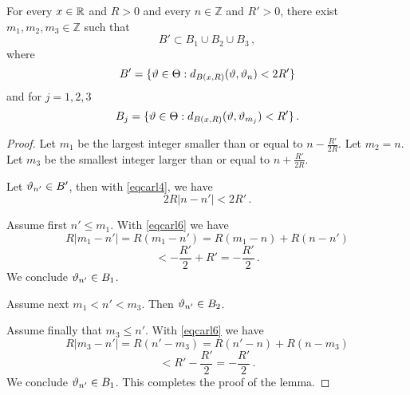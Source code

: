 \begin{lemma}
    \label{integer-ball-cover}
    \leanok
    For every $x\in {\mathbb{R}}$ and $R>0$ and every
    $n\in \mathbb{Z}$ and $R'>0$,
    there exist $m_1, m_2, m_3\in \mathbb{Z}$
    such that
    \begin{equation}\label{eqcarl5}
        B'\subset B_1\cup B_2\cup B_3\, ,
    \end{equation}
where
\begin{equation}
B'= \{ {\vartheta} \in {\Theta}: d_{B(x,R)}({\vartheta}, {\vartheta}_n)<2R'\}
\end{equation}
and for $j=1,2,3$
\begin{equation}
  B_j=
     \{ {\vartheta} \in {\Theta}: d_{B(x,R)}({\vartheta}, {\vartheta}_{m_j})<R'\}
     \, .
\end{equation}
\end{lemma}

\begin{proof}
\leanok
Let $m_1$ be the largest integer smaller than
or equal to
$n- \frac {R'} {2R}$.
Let $m_2=n$.
Let $m_3$ be the smallest integer larger than
or equal to $n+ \frac {R'} {2R}$.

Let ${\vartheta}_{n'}\in B'$, then with \eqref{eqcarl4},
we have
\begin{equation}\label{eqcarl6}
    2R|n-n'|< 2R'\, .
\end{equation}

Assume first $n'\le m_1$. With \eqref{eqcarl6}
we have
\begin{equation*}
    R|m_1-n'|=R(m_1-n')=R(m_1-n)+R(n-n')
\end{equation*}
\begin{equation}
    < -\frac{R'}2+R'=-\frac{R'}2\, .
\end{equation}
We conclude ${\vartheta}_{n'}\in B_1$.

Assume next $m_1<n'<m_3$. Then
${\vartheta}_{n'}\in B_2$.

Assume finally that $m_3\le n'$. With \eqref{eqcarl6}
we have
\begin{equation*}
    R|m_3-n'|=R(n'-m_3)=R(n'-n)+R(n-m_3)
\end{equation*}
\begin{equation}
    < R' -\frac{R'}2=-\frac{R'}2\, .
\end{equation}
We conclude ${\vartheta}_{n'}\in B_1$.
This completes the proof of the lemma.
\end{proof}


